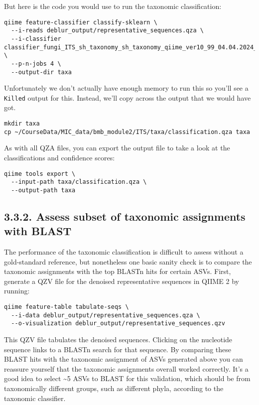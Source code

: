 \documentclass[
]{book}
\begin{document}
But here is the code you would use to run the taxonomic classification:

\begin{verbatim}
qiime feature-classifier classify-sklearn \
  --i-reads deblur_output/representative_sequences.qza \
  --i-classifier classifier_fungi_ITS_sh_taxonomy_sh_taxonomy_qiime_ver10_99_04.04.2024_dev.qza \
  --p-n-jobs 4 \
  --output-dir taxa
\end{verbatim}

Unfortunately we don't actually have enough memory to run this so you'll see a \texttt{Killed} output for this.
Instead, we'll copy across the output that we would have got.

\begin{verbatim}
mkdir taxa      
cp ~/CourseData/MIC_data/bmb_module2/ITS/taxa/classification.qza taxa
\end{verbatim}

As with all QZA files, you can export the output file to take a look at the classifications and confidence scores:

\begin{verbatim}
qiime tools export \
  --input-path taxa/classification.qza \
  --output-path taxa
\end{verbatim}

\subsection{3.3.2. Assess subset of taxonomic assignments with BLAST}\label{assess-subset-of-taxonomic-assignments-with-blast-2}

The performance of the taxonomic classification is difficult to assess without a gold-standard reference, but nonetheless one basic sanity check is to compare the taxonomic assignments with the top BLASTn hits for certain ASVs. First, generate a QZV file for the denoised representative sequences in QIIME 2 by running:

\begin{verbatim}
qiime feature-table tabulate-seqs \
  --i-data deblur_output/representative_sequences.qza \
  --o-visualization deblur_output/representative_sequences.qzv
\end{verbatim}

This QZV file tabulates the denoised sequences. Clicking on the nucleotide sequence links to a BLASTn search for that sequence. By comparing these BLAST hits with the taxonomic assignment of ASVs generated above you can reassure yourself that the taxonomic assignments overall worked correctly. It's a good idea to select \textasciitilde5 ASVs to BLAST for this validation, which should be from taxonomically different groups, such as different phyla, according to the taxonomic classifier.
\end{document}
